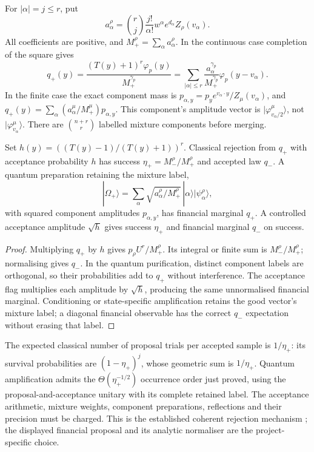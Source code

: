 For $|\alpha|=j\leq r$, put
\[
 a_\alpha^\rho=\binom rj\frac{j!}{\alpha!}w^\alpha
                         e^{d_\alpha}Z_\rho(v_\alpha).
\]
All coefficients are positive, and $M_+^\rho=\sum_\alpha
a_\alpha^\rho$. In the continuous case completion of the square gives
\begin{equation}
 q_+(y)=\frac{(T(y)+1)^r\varphi_p(y)}{M_+^{\gamma_p}}
       =\sum_{|\alpha|\leq r}\frac{a_\alpha^{\gamma_p}}
                 {M_+^{\gamma_p}}\varphi_p(y-v_\alpha).
 \label{eq:sg-positive-gaussian-mixture}
\end{equation}
In the finite case the exact component mass is
$p_{\alpha,y}=p_y e^{v_\alpha\cdot y}/Z_\mu(v_\alpha)$, and
$q_+(y)=\sum_\alpha(a_\alpha^\mu/M_+^\mu)p_{\alpha,y}$.
This component's amplitude vector is
$|\varphi_{v_\alpha/2}^\mu\rangle$, not
$|\varphi_{v_\alpha}^\mu\rangle$.
There are $\binom{n+r}{r}$ labelled mixture components before merging.

\begin{proposition}
\label{prop:sg-positive-rejection}
Set $h(y)=((T(y)-1)/(T(y)+1))^r$. Classical rejection from $q_+$
with acceptance probability $h$ has success
$\eta_+=M_-^\rho/M_+^\rho$ and accepted law $q_-$.
A quantum preparation retaining the mixture label,
\[
 |\Omega_+\rangle=\sum_\alpha
       \sqrt{a_\alpha^\rho/M_+^\rho}\,
               |\alpha\rangle|\psi_\alpha^\rho\rangle,
\]
with squared component amplitudes $p_{\alpha,y}$, has financial
marginal $q_+$. A controlled acceptance amplitude $\sqrt h$
gives success $\eta_+$ and financial marginal $q_-$ on success.
\end{proposition}
\begin{proof}
Multiplying $q_+$ by $h$ gives $p_\rho U^r/M_+^\rho$.
Its integral or finite sum is $M_-^\rho/M_+^\rho$; normalising
gives $q_-$. In the quantum purification, distinct component labels
are orthogonal, so their probabilities add to $q_+$ without
interference. The acceptance flag multiplies each amplitude by
$\sqrt h$, producing the same unnormalised financial marginal.
Conditioning or state-specific amplification retains the good vector's
mixture label; a diagonal financial observable has the correct
$q_-$ expectation without erasing that label.
\end{proof}

The expected classical number of proposal trials per accepted sample
is $1/\eta_+$: its survival probabilities are $(1-\eta_+)^j$,
whose geometric sum is $1/\eta_+$. Quantum amplification admits the
$\Theta(\eta_+^{-1/2})$ occurrence order just proved, using the
proposal-and-acceptance unitary with its complete retained label.
The acceptance arithmetic, mixture weights, component preparations,
reflections and their precision must be charged. This is the established
coherent rejection mechanism \citep{ozols2013}; the displayed financial
proposal and its analytic normaliser are the project-specific choice.

